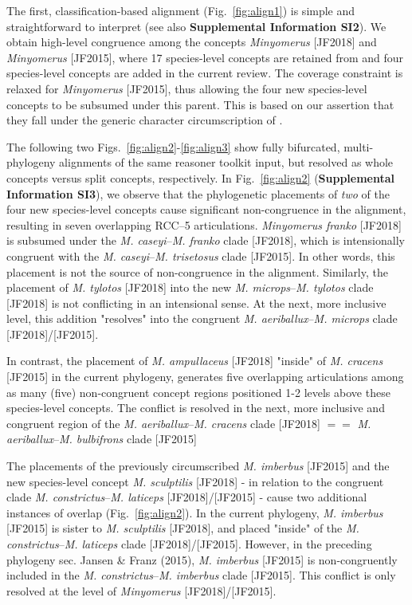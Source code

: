 \documentclass[fleqn,10pt,lineno]{wlpeerj} %
\begin{document}
	The first, classification-based alignment (Fig.~\ref{fig:align1}) is simple and straightforward to interpret (see also \textbf{Supplemental Information SI2}). 
	We obtain high-level congruence among the concepts \textit{Minyomerus} [JF2018] and \textit{Minyomerus} [JF2015], where 17 species-level concepts are retained from \citet{jansen2015} and four species-level concepts are added in the current review.
	The coverage constraint is relaxed for \textit{Minyomerus} [JF2015], thus allowing the four new species-level concepts to be subsumed under this parent.
	This is based on our assertion that they fall under the generic character circumscription of \citet{jansen2015}.
	
	The following two Figs.~\ref{fig:align2}-\ref{fig:align3} show fully bifurcated, multi-phylogeny alignments of the same reasoner toolkit input, but resolved as whole concepts versus split concepts, respectively.
	In Fig.~\ref{fig:align2} (\textbf{Supplemental Information SI3}), we observe that the phylogenetic placements of \emph{two} of the four new species-level concepts cause significant non-congruence in the alignment, resulting in seven overlapping RCC--5 articulations.
	\textit{Minyomerus franko} [JF2018] is subsumed under the \textit{M. caseyi}--\textit{M. franko} clade [JF2018], which is intensionally congruent with the \textit{M. caseyi}--\textit{M. trisetosus} clade [JF2015].
	In other words, this placement is not the source of non-congruence in the alignment.
	Similarly, the placement of \textit{M. tylotos} [JF2018] into the new \textit{M. microps}--\textit{M. tylotos} clade [JF2018] is not conflicting in an intensional sense.
	At the next, more inclusive level, this addition "resolves" into the congruent \textit{M. aeriballux}--\textit{M. microps} clade [JF2018]/[JF2015].
	
	In contrast, the placement of \textit{M. ampullaceus} [JF2018] "inside" of \textit{M. cracens} [JF2015] in the current phylogeny, generates five overlapping articulations among as many (five) non-congruent concept regions positioned 1-2 levels above these species-level concepts.
	The conflict is resolved in the next, more inclusive and congruent region of the \textit{M. aeriballux}--\textit{M. cracens} clade [JF2018] $==$ \textit{M. aeriballux}--\textit{M. bulbifrons} clade [JF2015]
	
	The placements of the previously circumscribed \textit{M. imberbus} [JF2015] and the new species-level concept \textit{M. sculptilis} [JF2018] - in relation to the congruent clade \textit{M. constrictus}--\textit{M. laticeps} [JF2018]/[JF2015] - cause two additional instances of overlap (Fig.~\ref{fig:align2}).
	In the current phylogeny, \textit{M. imberbus} [JF2015] is sister to \textit{M. sculptilis} [JF2018], and placed "inside" of the \textit{M. constrictus}--\textit{M. laticeps} clade [JF2018]/[JF2015].
	However, in the preceding phylogeny sec. Jansen \& Franz (2015), \textit{M. imberbus} [JF2015] is non-congruently included in the \textit{M. constrictus}--\textit{M. imberbus} clade [JF2015].
	This conflict is only resolved at the level of \textit{Minyomerus} [JF2018]/[JF2015].
	
\end{document}

